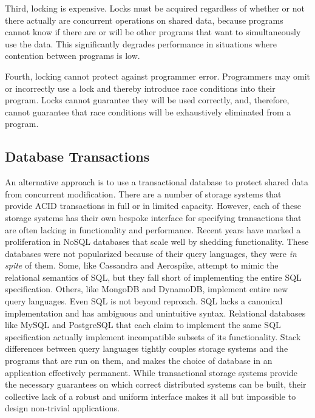 \documentclass[12pt]{article}
\begin{document}
Third, locking is expensive. Locks must be acquired regardless of whether or not there actually
are concurrent operations on shared data, because programs cannot know if there are or will be
other programs that want to simultaneously use the data. This significantly degrades
performance in situations where contention between programs is low.

Fourth, locking cannot protect against programmer error. Programmers may omit or incorrectly use a
lock and thereby introduce race conditions into their program. Locks cannot guarantee they will be
used correctly, and, therefore, cannot guarantee that race conditions will be exhaustively
eliminated from a program.

\subsection{Database Transactions}
An alternative approach is to use a transactional database to protect shared data from concurrent
modification. There are a number of storage systems that provide ACID transactions in full or in
limited capacity. However, each of these storage systems has their own bespoke interface for
specifying transactions that are often lacking in functionality and performance. Recent years have
marked a proliferation in NoSQL databases that scale well by shedding functionality. These
databases were not popularized because of their query languages, they were \emph{in spite} of
them. Some, like Cassandra and Aerospike, attempt to mimic the relational semantics of SQL, but
they fall short of implementing the entire SQL specification. Others, like MongoDB and DynamoDB,
implement entire new query languages. Even SQL is not beyond reproach. SQL lacks a canonical
implementation and has ambiguous and unintuitive syntax. \cite{sql} Relational databases like
MySQL and PostgreSQL that each claim to implement the same SQL specification actually implement
incompatible subsets of its functionality. Stack differences between query languages tightly
couples storage systems and the programs that are run on them, and makes the choice of database
in an application effectively permanent. While transactional storage systems provide the necessary
guarantees on which correct distributed systems can be built, their collective lack of a robust
and uniform interface makes it all but impossible to design non-trivial applications.
\end{document}
